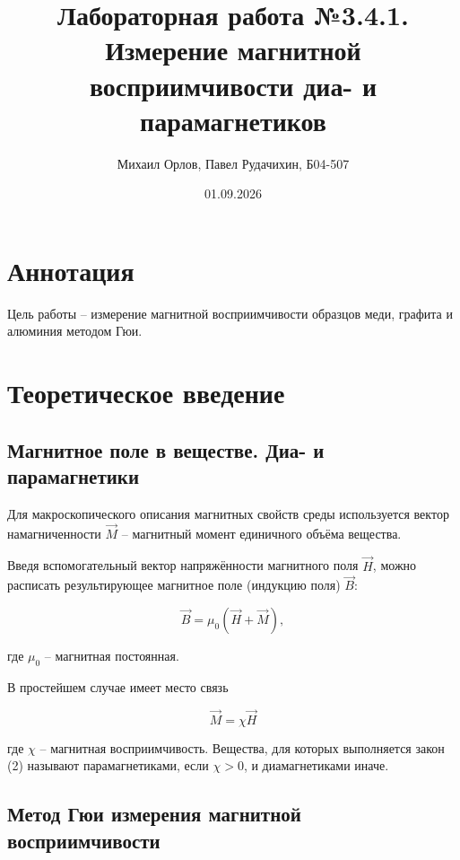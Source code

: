 \documentclass{article}
\title{Лабораторная работа №3.4.1. \\ \textbf{Измерение магнитной восприимчивости диа- и парамагнетиков}}
\author{Михаил Орлов, Павел Рудачихин, Б04-507}
\date{01.09.2026}
\newcommand{\w}{\vec}
\begin{document}
\maketitle{}

\section {Аннотация} 

	\hspace{4mm} Цель работы -- измерение магнитной восприимчивости образцов меди, графита и алюминия методом Гюи.
	

\section {Теоретическое введение}

	\subsection{Магнитное поле в веществе. Диа- и парамагнетики}

		\hspace{4mm} Для макроскопического описания магнитных свойств среды используется вектор намагниченности $\w{M}$ -- магнитный момент единичного объёма вещества. 
		
		Введя вспомогательный вектор напряжённости магнитного поля $\w{H}$, можно расписать результирующее магнитное поле (индукцию поля) $\w{B}$:
		
		\begin{equation}
			\w{B} = \mu_0(\w{H} + \w{M}),
		\end{equation}
		
		где $\mu_0$ -- магнитная постоянная.
	
		В простейшем случае имеет место связь
		
		\begin{equation}
			\w{M} = \chi \w{H}
		\end{equation}
		
		где $\chi$ -- магнитная восприимчивость. Вещества, для которых выполняется закон (2) называют парамагнетиками, если $\chi > 0$, и диамагнетиками иначе.
		
		
		
		
	\subsection{Метод Гюи измерения магнитной восприимчивости}
	
\end{document}
